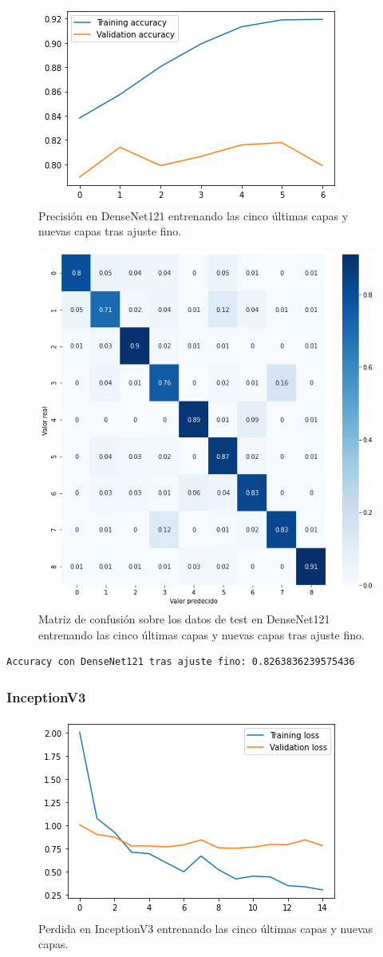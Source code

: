\begin{figure}[H]
  \centering
  \includegraphics[width=0.5\linewidth]{Imagenes/entrenamiento_redes/5-ult/densenet_5fine_acc.png}
  \caption{Precisión en DenseNet121 entrenando las cinco últimas capas y nuevas capas tras ajuste fino.}
\end{figure}

\begin{figure}[H]
  \centering
  \includegraphics[width=0.5\linewidth]{Imagenes/entrenamiento_redes/5-ult/densenet_5fine_matriz.png}
  \caption{Matriz de confusión sobre los datos de test en DenseNet121 entrenando las cinco últimas capas y nuevas capas tras ajuste fino.}
\end{figure}

\begin{lstlisting}
Accuracy con DenseNet121 tras ajuste fino: 0.8263836239575436
\end{lstlisting}



\subsubsection{InceptionV3}


\begin{figure}[H]
  \centering
  \includegraphics[width=0.5\linewidth]{Imagenes/entrenamiento_redes/5-ult/inception_5ult_loss.png}
  \caption{Perdida en InceptionV3 entrenando las cinco últimas capas y nuevas capas.}
\end{figure}

